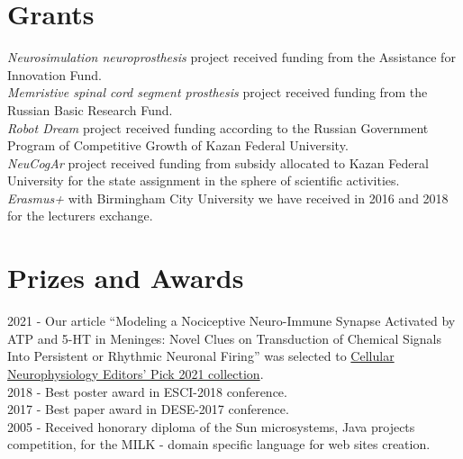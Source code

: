 \documentclass{moderncv}
\begin{document}
    \section{Grants}
    \emph{Neurosimulation neuroprosthesis} project received funding from the Assistance for Innovation Fund. \\
    \emph{Memristive spinal cord segment prosthesis} project received funding from the Russian Basic Research Fund. \\
    \emph{Robot Dream} project received funding according to the Russian Government Program of Competitive Growth of Kazan Federal University. \\
    \emph{NeuCogAr} project received funding from subsidy allocated to Kazan Federal University for the state assignment in the sphere of scientific activities. \\
    \emph{Erasmus+} with Birmingham City University we have received in 2016 and 2018 for the lecturers exchange.

    
    \section{Prizes and Awards}
    2021 - Our article ``Modeling a Nociceptive Neuro-Immune Synapse Activated by ATP and 5-HT in Meninges: Novel Clues on Transduction of Chemical Signals Into Persistent or Rhythmic Neuronal Firing'' was selected to \href{https://www.frontiersin.org/research-topics/21434/cellular-neurophysiology-editors-pick-2021}{Cellular Neurophysiology Editors' Pick 2021 collection}.\\
    2018 - Best poster award in ESCI-2018 conference.\\
    2017 - Best paper award in DESE-2017 conference.\\
    2005 - Received honorary diploma of the Sun microsystems, Java projects competition, for the MILK - domain specific language for web sites creation.
\end{document}
